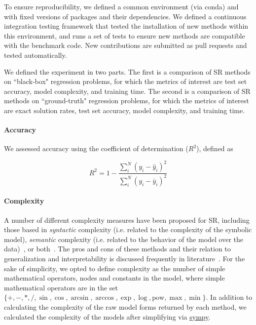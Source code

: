 To ensure reproducibility, we defined a common environment (via conda) and with fixed versions of packages and their dependencies. 
We defined a continuous integration testing framework that tested the installation of new methods within this environment, and runs a set of tests to ensure new methods are compatible with the benchmark code.  
New contributions are submitted as pull requests and tested automatically.

We defined the experiment in two parts.
The first is a comparison of SR methods on ``black-box" regression problems, for which the metrics of interest are test set accuracy, model complexity, and training time. 
The second is a comparison of SR methods on ``ground-truth" regression problems, for which the metrics of interest are exact solution rates, test set accuracy, model complexity, and training time. 


\paragraph{Accuracy}
We assessed accuracy using the coefficient of determination ($R^2$), defined as 

\begin{equation}
    R^2 = 1 - \frac{\sum_i^N{(y_i - \hat{y}_i)^2}}
                   {\sum_i^N{(y_i - \bar{y}_i)^2}}
\end{equation}

\paragraph{Complexity}
A number of different complexity measures have been proposed for SR, including those based in \textit{syntactic} complexity (i.e. related to the complexity of the symbolic model), \textit{semantic} complexity (i.e. related to the behavior of the model over the data)~\cite{vladislavlevaOrderNonlinearityComplexity2009a,udrescuAIFeynmanParetooptimal2020}, or both~\cite{kommendamichaelEvolvingSimpleSymbolic2015}. 
The pros and cons of these methods and their relation to generalization and interpretability is discussed frequently in literature~\cite{murdochDefinitionsMethodsApplications2019}. 
For the sake of simplicity, we opted to define complexity as the number of simple mathematical operators, nodes and constants in the model, where simple mathematical operators are in the set 
$\{+,
    -,
    *,
    {/},
    \sin,
    \cos,
    \arcsin,
    \arccos,
    \exp,
    \log, 
\text{pow},
\max,
\min \}$. 
In addition to calculating the complexity of the raw model forms returned by each method, we calculated the complexity of the models after simplifying via \href{https://www.sympy.org/en/index.html}{sympy}.

